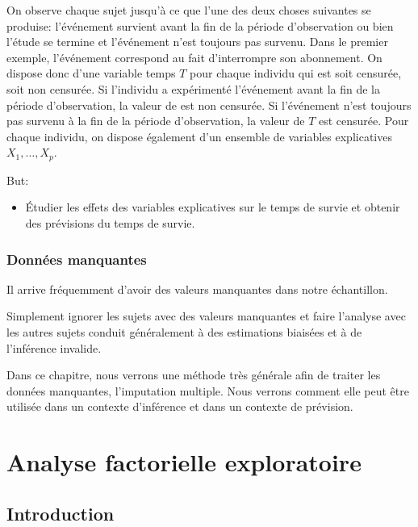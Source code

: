\documentclass[
]{book}
\providecommand{\tightlist}{%
  \setlength{\itemsep}{0pt}\setlength{\parskip}{0pt}}
\theoremstyle{definition}
\theoremstyle{definition}
\theoremstyle{definition}
\theoremstyle{remark}
\begin{document}
On observe chaque sujet jusqu'à ce que l'une des deux choses suivantes se produise: l'événement survient avant la fin de la période d'observation ou bien l'étude se termine et l'événement n'est toujours pas survenu. Dans le premier exemple, l'événement correspond au fait d'interrompre son abonnement. On dispose donc d'une variable temps \(T\) pour chaque individu qui est soit censurée, soit non censurée. Si l'individu a expérimenté l'événement avant la fin de la période d'observation, la valeur de est non censurée. Si l'événement n'est toujours pas survenu à la fin de la période d'observation, la valeur de \(T\) est censurée. Pour chaque individu, on dispose également d'un ensemble de variables explicatives \(X_1, \ldots, X_p\).

But:

\begin{itemize}
\tightlist
\item
  Étudier les effets des variables explicatives sur le temps de survie et obtenir des prévisions du temps de survie.
\end{itemize}

\hypertarget{donnuxe9es-manquantes}{%
\subsection{Données manquantes}\label{donnuxe9es-manquantes}}

Il arrive fréquemment d'avoir des valeurs manquantes dans notre échantillon.

Simplement ignorer les sujets avec des valeurs manquantes et faire l'analyse avec les autres sujets conduit généralement à des estimations biaisées et à de l'inférence invalide.

Dans ce chapitre, nous verrons une méthode très générale afin de traiter les données manquantes, l'imputation multiple. Nous verrons comment elle peut être utilisée dans un contexte d'inférence et dans un contexte de prévision.

\hypertarget{analyse-factorielle-exploratoire-1}{%
\chapter{Analyse factorielle exploratoire}\label{analyse-factorielle-exploratoire-1}}

\hypertarget{introduction-1}{%
\section{Introduction}\label{introduction-1}}
\end{document}
